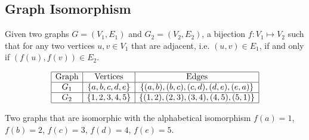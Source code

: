 \subsection{Graph Isomorphism}
Given two graphs $G=(V_1,E_1)$ and $G_2 = (V_2,E_2) $, a bijection $f: V_1 \mapsto 
V_2$ 
such that for any two vertices $u,v \in V_1$ that are adjacent, i.e. $(u, v) \in E_1$, if and only 
if $(f(u),f(v)) \in E_2$. 
\begin{table}[!ht]
\begin{center}
$$\begin{array}{|c|c|c|}\hline
\text{Graph}&\text{Vertices}&\text{Edges}\\\hline
G_1&\left\lbrace a,b,c,d,e \right\rbrace & \left\lbrace (a,b),(b,c),(c,d),(d,e),(e,a) \right\rbrace 
\\\hline
G_2&\left\lbrace 1,2,3,4,5 \right\rbrace & \left\lbrace (1,2),(2,3),(3,4),(4,5),(5,1) \right\rbrace 
\\\hline
\end{array} $$
\caption{Two graphs that are isomorphic with the alphabetical isomorphism $f(a)=1$, $f(b)=2$, $f(c) 
= 3$, $f(d)=4$, $f(e)=5$.}
\end{center} 
\label{table:ch1-graph-1}
\end{table}
